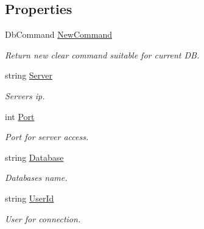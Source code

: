 \subsection*{Properties}
\begin{DoxyCompactItemize}
\item 
Db\+Command \mbox{\hyperlink{interface_uniform_data_operator_1_1_sql_1_1_i_sql_operator_a2b2c0870f78e1be23decc59e37d03cf0}{New\+Command}}
\begin{DoxyCompactList}\small\item\em Return new clear command suitable for current DB. \end{DoxyCompactList}\item 
string \mbox{\hyperlink{interface_uniform_data_operator_1_1_sql_1_1_i_sql_operator_ab1b593e38cb9377dac847811c483f2f3}{Server}}
\begin{DoxyCompactList}\small\item\em Server\textquotesingle{}s ip. \end{DoxyCompactList}\item 
int \mbox{\hyperlink{interface_uniform_data_operator_1_1_sql_1_1_i_sql_operator_a2d0ac2538fa196b181f6e0ab523db137}{Port}}
\begin{DoxyCompactList}\small\item\em Port for server access. \end{DoxyCompactList}\item 
string \mbox{\hyperlink{interface_uniform_data_operator_1_1_sql_1_1_i_sql_operator_a55b7f28ed4ab20f124e67e2d447f8b40}{Database}}
\begin{DoxyCompactList}\small\item\em Database\textquotesingle{}s name. \end{DoxyCompactList}\item 
string \mbox{\hyperlink{interface_uniform_data_operator_1_1_sql_1_1_i_sql_operator_abf0c3a32c8161030b37ccf960c395d4f}{User\+Id}}
\begin{DoxyCompactList}\small\item\em User for connection. \end{DoxyCompactList}\item 

\end{DoxyCompactItemize}
